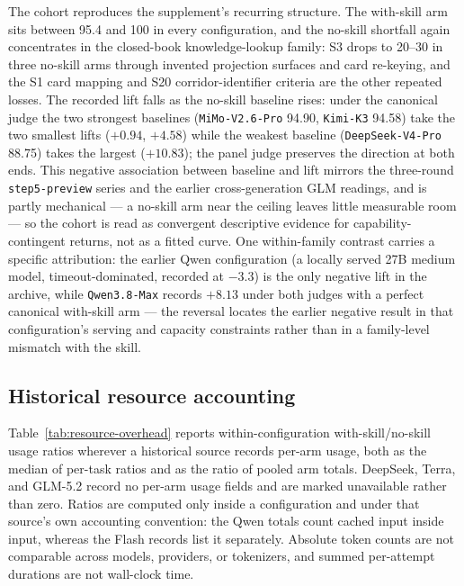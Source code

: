 \documentclass[11pt]{article}
\begin{document}
The cohort reproduces the supplement's recurring structure. The with-skill arm sits between 95.4 and 100 in every configuration, and the no-skill shortfall again concentrates in the closed-book knowledge-lookup family: S3 drops to 20--30 in three no-skill arms through invented projection surfaces and card re-keying, and the S1 card mapping and S20 corridor-identifier criteria are the other repeated losses. The recorded lift falls as the no-skill baseline rises: under the canonical judge the two strongest baselines (\texttt{MiMo-V2.6-Pro} 94.90, \texttt{Kimi-K3} 94.58) take the two smallest lifts ($+0.94$, $+4.58$) while the weakest baseline (\texttt{DeepSeek-V4-Pro} 88.75) takes the largest ($+10.83$); the panel judge preserves the direction at both ends. This negative association between baseline and lift mirrors the three-round \texttt{step5-preview} series and the earlier cross-generation GLM readings, and is partly mechanical --- a no-skill arm near the ceiling leaves little measurable room --- so the cohort is read as convergent descriptive evidence for capability-contingent returns, not as a fitted curve. One within-family contrast carries a specific attribution: the earlier Qwen configuration (a locally served 27B medium model, timeout-dominated, recorded at $-3.3$) is the only negative lift in the archive, while \texttt{Qwen3.8-Max} records $+8.13$ under both judges with a perfect canonical with-skill arm --- the reversal locates the earlier negative result in that configuration's serving and capacity constraints rather than in a family-level mismatch with the skill.

\subsection{Historical resource accounting}
Table~\ref{tab:resource-overhead} reports within-configuration with-skill/no-skill usage ratios wherever a historical source records per-arm usage, both as the median of per-task ratios and as the ratio of pooled arm totals. DeepSeek, Terra, and GLM-5.2 record no per-arm usage fields and are marked unavailable rather than zero. Ratios are computed only inside a configuration and under that source's own accounting convention: the Qwen totals count cached input inside input, whereas the Flash records list it separately. Absolute token counts are not comparable across models, providers, or tokenizers, and summed per-attempt durations are not wall-clock time.


\end{document}
